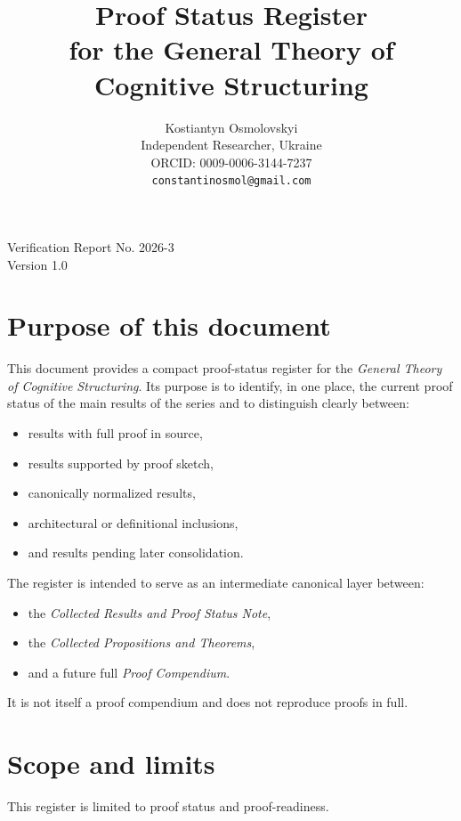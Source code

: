 \documentclass[12pt]{article}
\title{Proof Status Register\\
	\small for the General Theory of Cognitive Structuring}
\author{
	Kostiantyn Osmolovskyi\\
	\small Independent Researcher, Ukraine\\
	\small ORCID: 0009-0006-3144-7237\\
	\small \texttt{constantinosmol@gmail.com}
}
\date{}
\begin{document}
	\maketitle

\begin{center}
	\small
	Verification Report No. 2026-3\\
	Version 1.0
\end{center}

\vspace{0.5em}	
	
	\section{Purpose of this document}
	
	This document provides a compact proof-status register for the \emph{General Theory of
		Cognitive Structuring}. Its purpose is to identify, in one place, the current proof status of
	the main results of the series and to distinguish clearly between:
	\begin{itemize}[leftmargin=2em]
		\item results with full proof in source,
		\item results supported by proof sketch,
		\item canonically normalized results,
		\item architectural or definitional inclusions,
		\item and results pending later consolidation.
	\end{itemize}
	
	The register is intended to serve as an intermediate canonical layer between:
	\begin{itemize}[leftmargin=2em]
		\item the \emph{Collected Results and Proof Status Note},
		\item the \emph{Collected Propositions and Theorems},
		\item and a future full \emph{Proof Compendium}.
	\end{itemize}
	
	It is not itself a proof compendium and does not reproduce proofs in full.
	
	\section{Scope and limits}
	
	This register is limited to proof status and proof-readiness.
	
\end{document}
